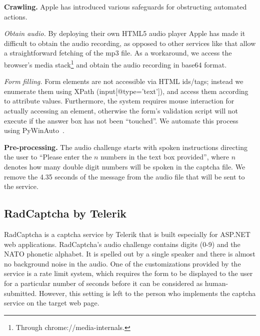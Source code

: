 \textbf{Crawling.} Apple has introduced various safeguards for obstructing automated actions.

\emph{Obtain audio.} By deploying their own HTML5 audio player Apple has made it 
difficult to obtain the audio recording, as opposed to other services like \re
that allow a straightforward fetching of the mp3 file. As a workaround, we access 
the browser's media stack\footnote{Through chrome://media-internals.} and obtain the 
audio recording in base64 format.

\emph{Form filling.} Form elements are not accessible via HTML ids/tags; instead we enumerate them 
using XPath (input[@type='text']), and access them according to attribute values.
Furthermore, the system requires mouse interaction for actually accessing an element, otherwise the 
form's validation script will not execute if the answer box has not been ``touched''. We automate this 
process using PyWinAuto~\cite{pywinauto}.


\textbf{Pre-processing.} The audio challenge starts with spoken instructions directing the user to 
``Please enter the $n$ numbers in the text box provided'', where $n$ denotes how many double digit numbers will be spoken
in the captcha file. We remove the 4.35 seconds of the message from the audio file that will be sent to the service.

\subsection{RadCaptcha by Telerik}

RadCaptcha is a captcha service by Telerik that is built especially for ASP.NET 
web applications. 
RadCaptcha's audio challenge contains digits (0-9) and the NATO phonetic alphabet. It is 
spelled out by a single speaker and there is almost no background noise in the audio. 
One of the customizations provided by the service is a rate limit system, which requires the form to 
be displayed to the user for a particular number of seconds before it can be considered as 
human-submitted. However, this setting is left to the person who implements the captcha 
service on the target web page.

